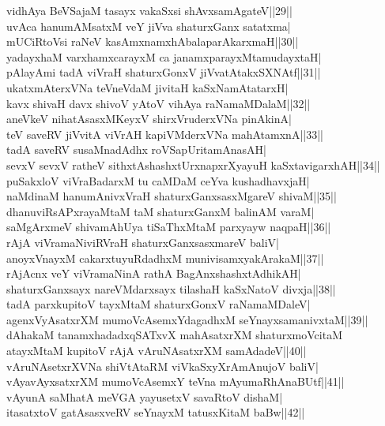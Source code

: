 \documentclass{article}
\begin{document}
vidhAya BeVSajaM tasayx vakaSxsi shAvxsamAgateV||29||\\
uvAca hanumAMsatxM veY jiVva shaturxGanx satatxma|\\
mUCiRtoVsi raNeV kasAmxnamxhAbalaparAkarxmaH||30||\\
yadayxhaM varxhamxcarayxM ca janamxparayxMtamudayxtaH|\\
pAlayAmi tadA viVraH shaturxGonxV jiVvatAtakxSXNAtf||31||\\
ukatxmAterxVNa teVneVdaM jivitaH kaSxNamAtatarxH|\\
kavx shivaH davx shivoV yAtoV vihAya raNamaMDalaM||32||\\
aneVkeV nihatAsasxMKeyxV shirxVruderxVNa pinAkinA|\\
teV saveRV jiVvitA viVrAH kapiVMderxVNa mahAtamxnA||33||\\
tadA saveRV susaMnadAdhx roVSapUritamAnasAH|\\
sevxV sevxV ratheV sithxtAshashxtUrxnapxrXyayuH kaSxtavigarxhAH||34||\\
puSakxloV viVraBadarxM tu caMDaM ceYva kushadhavxjaH|\\
naMdinaM hanumAnivxVraH shaturxGanxsasxMgareV shivaM||35||\\
dhanuviRsAPxrayaMtaM taM shaturxGanxM balinAM varaM|\\
saMgArxmeV shivamAhUya tiSaThxMtaM parxyayw naqpaH||36||\\
rAjA viVramaNiviRVraH shaturxGanxsasxmareV baliV|\\
anoyxVnayxM cakarxtuyuRdadhxM munivisamxyakArakaM||37||\\
rAjAcnx veY viVramaNinA rathA BagAnxshashxtAdhikAH|\\
shaturxGanxsayx nareVMdarxsayx tilashaH kaSxNatoV divxja||38||\\
tadA parxkupitoV tayxMtaM shaturxGonxV raNamaMDaleV|\\
agenxVyAsatxrXM mumoVcAsemxYdagadhxM seYnayxsamanivxtaM||39||\\
dAhakaM tanamxhadadxqSATxvX mahAsatxrXM shaturxmoVcitaM\\
atayxMtaM kupitoV rAjA vAruNAsatxrXM samAdadeV||40||\\
vAruNAsetxrXVNa shiVtAtaRM viVkaSxyXrAmAnujoV baliV|\\
vAyavAyxsatxrXM mumoVcAsemxY teVna mAyumaRhAnaBUtf||41||\\
vAyunA saMhatA meVGA yayusetxV savaRtoV dishaM|\\
itasatxtoV gatAsasxveRV seYnayxM tatusxKitaM baBw||42||\\
\end{document}
